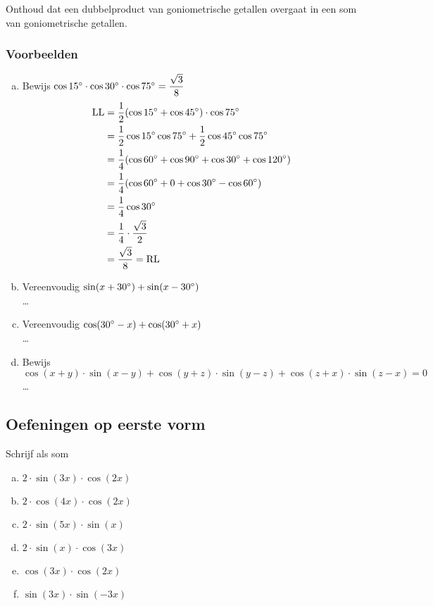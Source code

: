 \documentclass[twoside,a4paper,12pt]{article}
\begin{document}
Onthoud dat een dubbelproduct van goniometrische getallen overgaat in een som van goniometrische getallen.

\subsubsection*{Voorbeelden}

\begin{enumerate}[(a)]
  \item Bewijs $\cos 15^\circ \cdot \cos 30^\circ \cdot \cos 75^\circ = \dfrac{\sqrt{3}}{8}$
  \begin{align*}
    \mbox{LL} &= \dfrac{1}{2}(\cos 15^\circ + \cos 45^\circ)\cdot \cos 75^\circ\\
              &= \dfrac{1}{2}\cos 15^\circ \cos 75^\circ + \dfrac{1}{2}\cos 45^\circ \cos 75^\circ\\
              &= \dfrac{1}{4}(\cos 60^\circ + \cos 90^\circ + \cos 30^\circ + \cos 120^\circ)\\
              &= \dfrac{1}{4}(\cos 60^\circ + 0 + \cos 30^\circ - \cos 60^\circ)\\
              &= \dfrac{1}{4}\cos 30^\circ\\
              &= \dfrac{1}{4}\cdot\dfrac{\sqrt{3}}{2}\\
              &= \dfrac{\sqrt{3}}{8} = \mbox{RL}
  \end{align*}
  \item Vereenvoudig $\sin(x+30^\circ)+\sin(x-30^\circ)$\\
  \ldots
  \item Vereenvoudig $\cos(30^\circ-x)+\cos(30^\circ+x)$\\
  \ldots
  \item Bewijs $\cos(x+y)\cdot\sin(x-y)+\cos(y+z)\cdot\sin(y-z)+\cos(z+x)\cdot\sin(z-x)=0$\\
  \ldots
\end{enumerate}

\subsection{Oefeningen op eerste vorm}

\begin{oefening}
Schrijf als som
\begin{enumerate}[(a)]
\itemsep.5em
  \item $2\cdot \sin(3x)\cdot \cos(2x)$
  \item $2\cdot \cos(4x)\cdot \cos(2x)$
  \item $2\cdot \sin(5x)\cdot \sin(x)$
  \item $2\cdot \sin(x)\cdot \cos(3x)$
  \item $\cos(3x)\cdot \cos(2x)$
  \item $\sin(3x)\cdot \sin(-3x)$
\end{enumerate}
\end{oefening}
\end{document}

